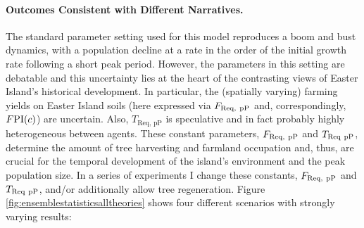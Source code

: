 \paragraph{Outcomes Consistent with Different Narratives.}
The standard parameter setting used for this model reproduces a boom and bust dynamics, with a population decline at a rate in the order of the initial growth rate following a short peak period.
However, the parameters in this setting are debatable and this uncertainty lies at the heart of the contrasting views of Easter Island's historical development.
In particular, the (spatially varying) farming yields on Easter Island soils (here expressed via $F_{\rm Req, \ pP}$ and, correspondingly, $F{\rm PI}(c)$) are uncertain.
Also, $T_\text{Req, pP}$ is speculative and in fact probably highly heterogeneous between agents.
These constant parameters, $F_{\rm Req, \ pP}$ and $T_{\rm Req\ pP}$, determine the amount of tree harvesting and farmland occupation and, thus, are crucial for the temporal development of the island's environment and the peak population size. 
In a series of experiments I change these constants, $F_{\rm Req, \ pP}$ and $T_{\rm Req\ pP}$, and/or additionally allow tree regeneration.
Figure \ref{fig:ensemblestatisticsalltheories} shows four different scenarios with strongly varying results:
